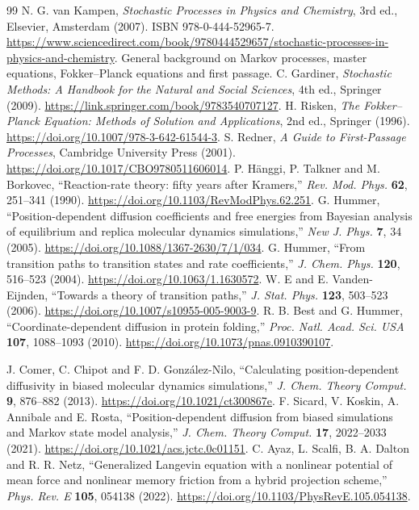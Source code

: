 \documentclass[11pt,a4paper]{article}
\theoremstyle{remark}\newtheorem*{remark}{Physical interpretation}
\begin{document}
\begin{thebibliography}{99}
 N. G. van Kampen, \emph{Stochastic Processes in Physics and Chemistry}, 3rd ed., Elsevier, Amsterdam (2007). ISBN 978-0-444-52965-7. \url{https://www.sciencedirect.com/book/9780444529657/stochastic-processes-in-physics-and-chemistry}. General background on Markov processes, master equations, Fokker--Planck equations and first passage.
 C. Gardiner, \emph{Stochastic Methods: A Handbook for the Natural and Social Sciences}, 4th ed., Springer (2009). \url{https://link.springer.com/book/9783540707127}.
 H. Risken, \emph{The Fokker--Planck Equation: Methods of Solution and Applications}, 2nd ed., Springer (1996). \url{https://doi.org/10.1007/978-3-642-61544-3}.
 S. Redner, \emph{A Guide to First-Passage Processes}, Cambridge University Press (2001). \url{https://doi.org/10.1017/CBO9780511606014}.
 P. H\"anggi, P. Talkner and M. Borkovec, ``Reaction-rate theory: fifty years after Kramers,'' \emph{Rev. Mod. Phys.} \textbf{62}, 251--341 (1990). \url{https://doi.org/10.1103/RevModPhys.62.251}.
 G. Hummer, ``Position-dependent diffusion coefficients and free energies from Bayesian analysis of equilibrium and replica molecular dynamics simulations,'' \emph{New J. Phys.} \textbf{7}, 34 (2005). \url{https://doi.org/10.1088/1367-2630/7/1/034}.
 G. Hummer, ``From transition paths to transition states and rate coefficients,'' \emph{J. Chem. Phys.} \textbf{120}, 516--523 (2004). \url{https://doi.org/10.1063/1.1630572}.
 W. E and E. Vanden-Eijnden, ``Towards a theory of transition paths,'' \emph{J. Stat. Phys.} \textbf{123}, 503--523 (2006). \url{https://doi.org/10.1007/s10955-005-9003-9}.
 R. B. Best and G. Hummer, ``Coordinate-dependent diffusion in protein folding,'' \emph{Proc. Natl. Acad. Sci. USA} \textbf{107}, 1088--1093 (2010). \url{https://doi.org/10.1073/pnas.0910390107}.

 J. Comer, C. Chipot and F. D. Gonz\'alez-Nilo, ``Calculating position-dependent diffusivity in biased molecular dynamics simulations,'' \emph{J. Chem. Theory Comput.} \textbf{9}, 876--882 (2013). \url{https://doi.org/10.1021/ct300867e}.
 F. Sicard, V. Koskin, A. Annibale and E. Rosta, ``Position-dependent diffusion from biased simulations and Markov state model analysis,'' \emph{J. Chem. Theory Comput.} \textbf{17}, 2022--2033 (2021). \url{https://doi.org/10.1021/acs.jctc.0c01151}.
 C. Ayaz, L. Scalfi, B. A. Dalton and R. R. Netz, ``Generalized Langevin equation with a nonlinear potential of mean force and nonlinear memory friction from a hybrid projection scheme,'' \emph{Phys. Rev. E} \textbf{105}, 054138 (2022). \url{https://doi.org/10.1103/PhysRevE.105.054138}.
\end{thebibliography}
\end{document}
